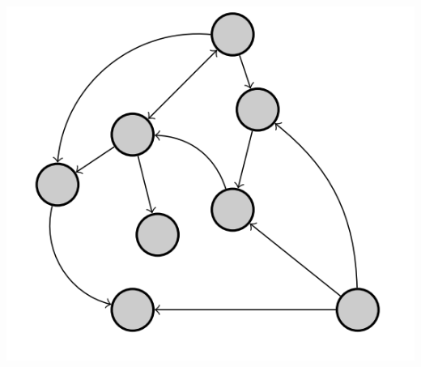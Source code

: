 \documentclass[11pt]{article}
\begin{document}
\begin{center}
    \includegraphics{img/directed_graph.png}
\end{center}
\end{document}
